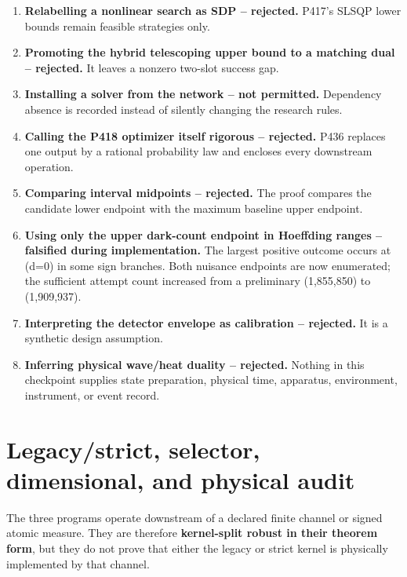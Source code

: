 \documentclass[11pt,a4paper,openany]{report}
\begin{document}
\begin{enumerate}
\item 
\textbf{Relabelling a nonlinear search as SDP -- rejected.} P417's SLSQP lower bounds remain feasible strategies only.

\item 
\textbf{Promoting the hybrid telescoping upper bound to a matching dual -- rejected.} It leaves a nonzero two-slot success gap.

\item 
\textbf{Installing a solver from the network -- not permitted.} Dependency absence is recorded instead of silently changing the research rules.

\item 
\textbf{Calling the P418 optimizer itself rigorous -- rejected.} P436 replaces one output by a rational probability law and encloses every downstream operation.

\item 
\textbf{Comparing interval midpoints -- rejected.} The proof compares the candidate lower endpoint with the maximum baseline upper endpoint.

\item 
\textbf{Using only the upper dark-count endpoint in Hoeffding ranges -- falsified during implementation.} The largest positive outcome occurs at (d=0) in some sign branches. Both nuisance endpoints are now enumerated; the sufficient attempt count increased from a preliminary (1,855,850) to (1,909,937).

\item 
\textbf{Interpreting the detector envelope as calibration -- rejected.} It is a synthetic design assumption.

\item 
\textbf{Inferring physical wave/\allowbreak{}heat duality -- rejected.} Nothing in this checkpoint supplies state preparation, physical time, apparatus, environment, instrument, or event record.

\end{enumerate}

\chapter{Legacy/\allowbreak{}strict, selector, dimensional, and physical audit}

The three programs operate downstream of a declared finite channel or signed atomic measure. They are therefore \textbf{kernel-split robust in their theorem form}, but they do not prove that either the legacy or strict kernel is physically implemented by that channel.
\end{document}
